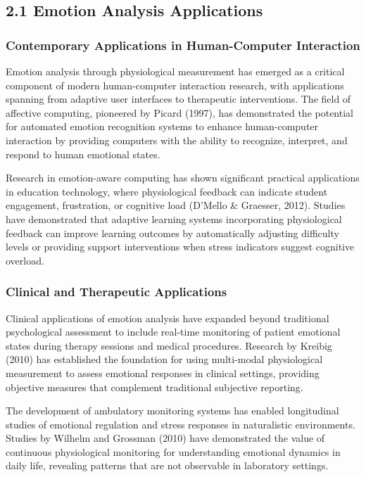 \documentclass[11pt,a4paper]{article}
\begin{document}
\subsection{2.1 Emotion Analysis Applications}

\subsubsection{Contemporary Applications in Human-Computer Interaction}

Emotion analysis through physiological measurement has emerged as a critical component of modern human-computer
interaction research, with applications spanning from adaptive user interfaces to therapeutic interventions. The field
of affective computing, pioneered by Picard (1997), has demonstrated the potential for automated emotion recognition
systems to enhance human-computer interaction by providing computers with the ability to recognize, interpret, and
respond to human emotional states.

Research in emotion-aware computing has shown significant practical applications in education technology, where
physiological feedback can indicate student engagement, frustration, or cognitive load (D'Mello \& Graesser, 2012).
Studies have demonstrated that adaptive learning systems incorporating physiological feedback can improve learning
outcomes by automatically adjusting difficulty levels or providing support interventions when stress indicators suggest
cognitive overload.

\subsubsection{Clinical and Therapeutic Applications}

Clinical applications of emotion analysis have expanded beyond traditional psychological assessment to include real-time
monitoring of patient emotional states during therapy sessions and medical procedures. Research by Kreibig (2010) has
established the foundation for using multi-modal physiological measurement to assess emotional responses in clinical
settings, providing objective measures that complement traditional subjective reporting.

The development of ambulatory monitoring systems has enabled longitudinal studies of emotional regulation and stress
responses in naturalistic environments. Studies by Wilhelm and Grossman (2010) have demonstrated the value of continuous
physiological monitoring for understanding emotional dynamics in daily life, revealing patterns that are not observable
in laboratory settings.
\end{document}
